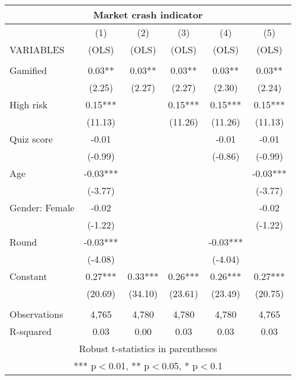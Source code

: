 \documentclass[]{article}
\begin{document}
\begin{tabular}{lccccc}
\multicolumn{6}{c}{Market crash indicator} \\ \hline
 & (1) & (2) & (3) & (4) & (5) \\
VARIABLES & (OLS) & (OLS) & (OLS) & (OLS) & (OLS) \\ \hline
 &  &  &  &  &  \\
Gamified & 0.03** & 0.03** & 0.03** & 0.03** & 0.03** \\
 & (2.25) & (2.27) & (2.27) & (2.30) & (2.24) \\
High risk & 0.15*** &  & 0.15*** & 0.15*** & 0.15*** \\
 & (11.13) &  & (11.26) & (11.26) & (11.13) \\
Quiz score & -0.01 &  &  & -0.01 & -0.01 \\
 & (-0.99) &  &  & (-0.86) & (-0.99) \\
Age & -0.03*** &  &  &  & -0.03*** \\
 & (-3.77) &  &  &  & (-3.77) \\
Gender: Female & -0.02 &  &  &  & -0.02 \\
 & (-1.22) &  &  &  & (-1.22) \\
Round & -0.03*** &  &  & -0.03*** &  \\
 & (-4.08) &  &  & (-4.04) &  \\
Constant & 0.27*** & 0.33*** & 0.26*** & 0.26*** & 0.27*** \\
 & (20.69) & (34.10) & (23.61) & (23.49) & (20.75) \\
 &  &  &  &  &  \\
Observations & 4,765 & 4,780 & 4,780 & 4,780 & 4,765 \\
 R-squared & 0.03 & 0.00 & 0.03 & 0.03 & 0.03 \\ \hline
\multicolumn{6}{c}{ Robust t-statistics in parentheses} \\
\multicolumn{6}{c}{ *** p$<$0.01, ** p$<$0.05, * p$<$0.1} \\
\end{tabular}
\end{document}
